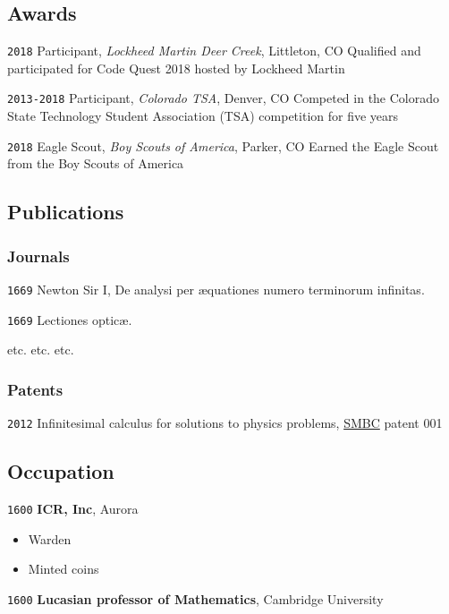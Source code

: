 \documentclass[
  letterpaper,
  DIV=11,
  numbers=noendperiod]{scrartcl}
\providecommand{\tightlist}{%
  \setlength{\itemsep}{0pt}\setlength{\parskip}{0pt}}
\begin{document}
\subsection{Awards}\label{awards}

\texttt{2018} Participant, \emph{Lockheed Martin Deer Creek}, Littleton,
CO Qualified and participated for Code Quest 2018 hosted by Lockheed
Martin

\texttt{2013-2018} Participant, \emph{Colorado TSA}, Denver, CO Competed
in the Colorado State Technology Student Association (TSA) competition
for five years

\texttt{2018} Eagle Scout, \emph{Boy Scouts of America}, Parker, CO
Earned the Eagle Scout from the Boy Scouts of America

\subsection{Publications}\label{publications}

\subsubsection{Journals}\label{journals}

\texttt{1669} Newton Sir I, De analysi per æquationes numero terminorum
infinitas.

\texttt{1669} Lectiones opticæ.

etc. etc. etc.

\subsubsection{Patents}\label{patents}

\texttt{2012} Infinitesimal calculus for solutions to physics problems,
\href{http://www.techdirt.com/articles/20121011/09312820678/if-patents-had-been-around-time-newton.shtml}{SMBC}
patent 001

\subsection{Occupation}\label{occupation}

\texttt{1600} \textbf{ICR, Inc}, Aurora

\begin{itemize}
\tightlist
\item
  Warden
\item
  Minted coins
\end{itemize}

\texttt{1600} \textbf{Lucasian professor of Mathematics}, Cambridge
University
\end{document}
